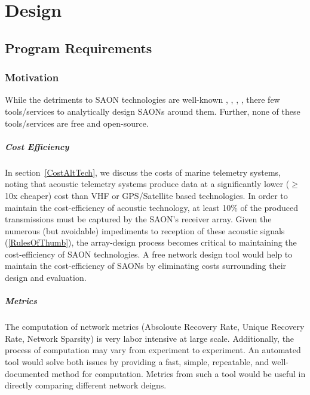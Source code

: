 \chapter{Design}

\section{Program Requirements}


\subsection{Motivation}
While the detriments to SAON technologies are well-known \cite{Akbarzadeh2013}, \cite{Heupel2006}, \cite{Howard2002},  \cite{Kessel2015}, \cite{Steel2014} there few tools/services to analytically design SAONs around them.  Further, none of these tools/services are free and open-source.


\paragraph{Cost Efficiency}
\label{motivationCost}
In section~\ref{CostAltTech}, we discuss the costs of marine telemetry systems, noting that acoustic telemetry systems produce data at a significantly lower ($\ge$10x cheaper) cost than VHF or GPS/Satellite based technologies.  In order to maintain the cost-efficiency of acoustic technology, at least 10$\%$ of the produced transmissions must be captured by the SAON's receiver array.  Given the numerous (but avoidable) impediments to reception of these acoustic signals (\ref{RulesOfThumb}), the array-design process becomes critical to maintaining the cost-efficiency of SAON technologies.  A free network design tool would help to maintain the cost-efficiency of SAONs by eliminating costs surrounding their design and evaluation.  


\paragraph{Metrics}
\label{motivationMetrics}
The computation of network metrics (Absoloute Recovery Rate, Unique Recovery Rate, Network Sparsity) is very labor intensive at large scale.  Additionally, the process of computation may vary from experiment to experiment.  An automated tool would solve both issues by providing a fast, simple, repeatable, and well-documented method for computation.  Metrics from such a tool would be useful in directly comparing different network deigns.


